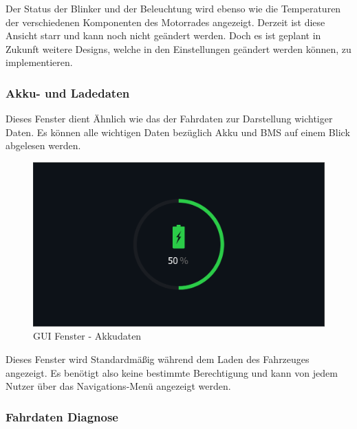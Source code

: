 Der Status der Blinker und der Beleuchtung wird ebenso wie die Temperaturen der verschiedenen Komponenten des Motorrades angezeigt. Derzeit ist diese Ansicht starr und kann noch nicht geändert werden. Doch es ist geplant in Zukunft weitere Designs, welche in den Einstellungen geändert werden können, zu implementieren.

\newpage

\subsubsection{Akku- und Ladedaten}

Dieses Fenster dient Ähnlich wie das der Fahrdaten zur Darstellung wichtiger Daten. Es können alle wichtigen Daten bezüglich Akku und BMS auf einem Blick abgelesen werden. 

\begin{figure}[H]
	\begin{center}
		\includegraphics[scale=0.25]{figures/hcis/window_battery.png}
			\caption{GUI Fenster - Akkudaten}
			\label{fig:pageAkku}
	\end{center}
\end{figure}

Dieses Fenster wird Standardmäßig während dem Laden des Fahrzeuges angezeigt. Es benötigt also keine bestimmte Berechtigung und kann von jedem Nutzer über das Navigations-Menü angezeigt werden.

\subsubsection{Fahrdaten Diagnose}

